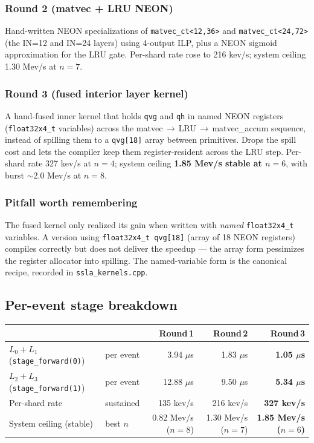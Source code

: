 \documentclass[11pt,a4paper]{article}
\begin{document}
\subsubsection*{Round 2 (matvec + LRU NEON)}

Hand-written NEON specializations of \texttt{matvec\_ct<12,36>} and
\texttt{matvec\_ct<24,72>} (the IN=12 and IN=24 layers) using 4-output
ILP, plus a NEON sigmoid approximation for the LRU gate. Per-shard rate
rose to 216 kev/s; system ceiling 1.30 Mev/s at $n=7$.

\subsubsection*{Round 3 (fused interior layer kernel)}

A hand-fused inner kernel that holds \texttt{qvg} and \texttt{qh} in
named NEON registers (\texttt{float32x4\_t} variables) across the
matvec\,\(\to\)\,LRU\,\(\to\)\,matvec\_accum sequence, instead of
spilling them to a \texttt{qvg[18]} array between primitives. Drops the
spill cost and lets the compiler keep them register-resident across
the LRU step. Per-shard rate 327 kev/s at $n=4$; system ceiling
\textbf{1.85 Mev/s stable at $n=6$}, with burst $\sim$2.0 Mev/s at
$n=8$.

\subsubsection*{Pitfall worth remembering}

The fused kernel only realized its gain when written with \emph{named}
\texttt{float32x4\_t} variables. A version using
\texttt{float32x4\_t qvg[18]} (array of 18 NEON registers) compiles
correctly but does not deliver the speedup --- the array form pessimizes
the register allocator into spilling. The named-variable form is the
canonical recipe, recorded in \texttt{ssla\_kernels.cpp}.

\subsection{Per-event stage breakdown}

\begin{tabularx}{\linewidth}{lXrrr}
\toprule
& & Round\,1 & Round\,2 & Round\,3 \\
\midrule
\(L_0+L_1\) (\texttt{stage\_forward(0)}) & per event & 3.94 \(\mu\)s & 1.83 \(\mu\)s & \textbf{1.05 \(\mu\)s} \\
\(L_2+L_3\) (\texttt{stage\_forward(1)}) & per event & 12.88 \(\mu\)s & 9.50 \(\mu\)s & \textbf{5.34 \(\mu\)s} \\
Per-shard rate                          & sustained  & 135 kev/s   & 216 kev/s  & \textbf{327 kev/s} \\
System ceiling (stable)                  & best $n$  & 0.82 Mev/s ($n=8$) & 1.30 Mev/s ($n=7$) & \textbf{1.85 Mev/s ($n=6$)} \\
\bottomrule
\end{tabularx}
\end{document}
